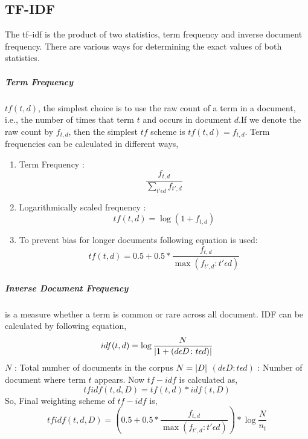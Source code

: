 \documentclass[12pt,a4paper]{report}
\DeclarePairedDelimiter{\abs}{\lvert}{\rvert}
\begin{document}
\subsection{TF-IDF}
The tf–idf is the product of two statistics, term frequency and inverse document frequency. There are various ways for determining the exact values of both statistics.

\subparagraph{Term Frequency}$tf(t,d)$, the simplest choice is to use the raw count of a term in a document, i.e., the number of times that term $t$ and occurs in document $d$.If we denote the raw count by $f_{t,d}$, then the simplest $tf$ scheme is $tf(t,d) = f_{t,d}$. Term frequencies can be calculated in  different ways,
\begin{enumerate}
    \item Term Frequency : 
    \begin{equation}
        \dfrac{f_{t,d}}{\sum_{t'\epsilon d}^{}f_{t',d}}
    \end{equation}
    \item Logarithmically scaled frequency :
    \begin{equation}
         tf(t,d)=\log(1+f_{t,d})
    \end{equation}
   
    \item To prevent bias for longer documents following equation is used:
    \begin{equation}
        tf(t,d) = 0.5 + 0.5 * \frac{f_{t,d}}{\max{(f_{t',d}\colon t'\epsilon d)}}
    \end{equation}
\end{enumerate}

\subparagraph{Inverse Document Frequency}
is a measure whether a term is common or rare across all document. IDF can be calculated by following equation,
\begin{equation}
    idf(t,d) = \log \frac{N}{\abs{1+(d\epsilon D\colon t\epsilon d)}}
\end{equation}
\noindent
$N$ : Total number of documents in the corpus $N = \abs{D}$\newline
$(d \epsilon D\colon t\epsilon d)$ : \textrm{Number of document where term $t$ appears.}\newline
\vspace{0.5cm}
Now $tf-idf$ is calculated as,
\begin{equation}
    tfidf(t, d, D) = tf(t, d)*idf(t, D)
\end{equation}
So, Final weighting scheme of $tf-idf$ is,
\begin{equation}
        tfidf(t, d, D)=(0.5 + 0.5 * \frac{f_{t,d}}{\max{(f_{t',d}\colon t'\epsilon d)}})*\log \frac{N}{n_t}
\end{equation}
\clearpage
\end{document}
